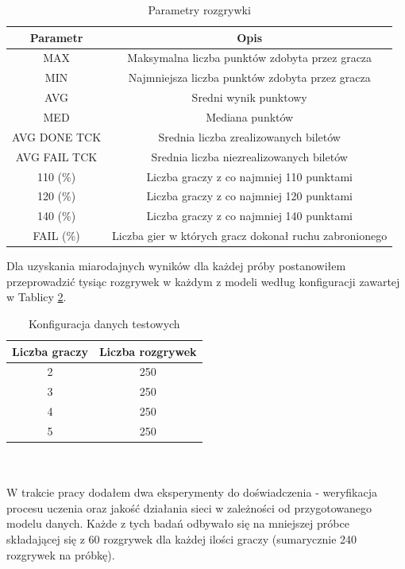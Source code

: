 \documentclass[12pt, oneside]{report}
\begin{document}
\begin{table}[h]
	\begin{center}
		\begin{tabular}{| c | c |} \hline
			Parametr  & Opis \\ \hline
			MAX & Maksymalna liczba punktów zdobyta przez gracza \\ \hline
			MIN & Najmniejsza liczba punktów zdobyta przez gracza \\ \hline
			AVG & Sredni wynik punktowy \\ \hline
			MED & Mediana punktów \\ \hline
			AVG DONE TCK & Srednia liczba zrealizowanych biletów \\ \hline
			AVG FAIL TCK & Srednia liczba niezrealizowanych biletów \\ \hline
			110 (\%) & Liczba graczy z co najmniej 110 punktami \\ \hline
			120 (\%) & Liczba graczy z co najmniej 120 punktami \\ \hline
			140 (\%) & Liczba graczy z co najmniej 140 punktami \\ \hline
			FAIL (\%) & Liczba gier w których gracz dokonał ruchu zabronionego \\ \hline
		\end{tabular}
		\caption{Parametry rozgrywki}
		\label{table:outputparam}
	\end{center}
\end{table}
Dla uzyskania miarodajnych wyników dla każdej próby postanowiłem przeprowadzić tysiąc rozgrywek w każdym z modeli według konfiguracji zawartej w Tablicy \ref{table:gameconfig}. 
\begin{table}[h]
	\begin{center}
		\begin{tabular}{| c | c |} \hline
			Liczba graczy & Liczba rozgrywek \\ \hline
			2 & 250 \\ \hline
			3 & 250 \\ \hline
			4 & 250 \\ \hline
			5 & 250 \\ \hline
		\end{tabular}
		\caption{Konfiguracja danych testowych}
		\label{table:gameconfig}
	\end{center}
\end{table}
\\ \\ W trakcie pracy dodałem dwa eksperymenty do doświadczenia - weryfikacja procesu uczenia oraz jakość działania sieci w zależności od przygotowanego modelu danych. Każde z tych badań odbywało się na mniejszej próbce składającej się z 60 rozgrywek dla każdej ilości graczy (sumarycznie 240 rozgrywek na próbkę).
\end{document}
